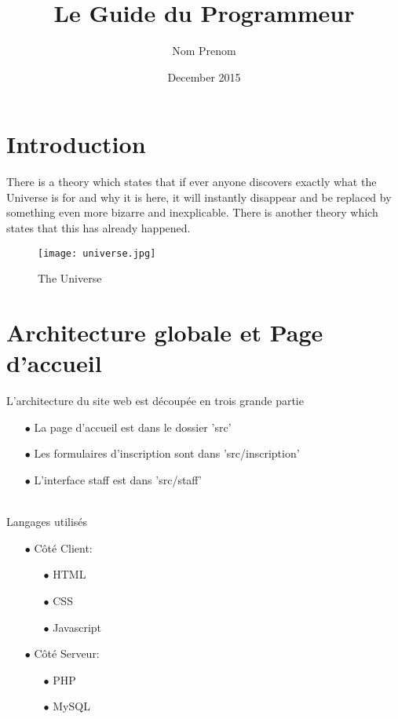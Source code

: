 \documentclass{article}
\title{Le Guide du Programmeur}
\author{Nom Prenom }
\date{December 2015}
\begin{document}
\maketitle

\section{Introduction}

There is a theory which states that if ever anyone discovers exactly what the Universe is for and why it is here, it will instantly disappear and be replaced by something even more bizarre and inexplicable.
There is another theory which states that this has already happened.

\begin{figure}[h!]
\centering
\texttt{[image: universe.jpg]}
\caption{The Universe}
\label{fig:univerise}
\end{figure}

\section{Architecture globale et Page d'accueil}

L'architecture du site web est découpée en trois grande partie

\begin{itemize}
\item[$\bullet$] La page d'accueil est dans le dossier 'src'
\item[$\bullet$] Les formulaires d'inscription sont dans 'src/inscription'
\item[$\bullet$] L'interface staff est dans 'src/staff'
\end{itemize}\\

Langages utilisés
\begin{itemize}
\item[$\bullet$] Côté Client: \begin{itemize}
        \item[$\bullet$] HTML
        \item[$\bullet$] CSS
        \item[$\bullet$] Javascript
    \end{itemize}
\item[$\bullet$] Côté Serveur: \begin{itemize}
        \item[$\bullet$] PHP
        \item[$\bullet$] MySQL
    \end{itemize}
\end{itemize}\\
\end{document}
